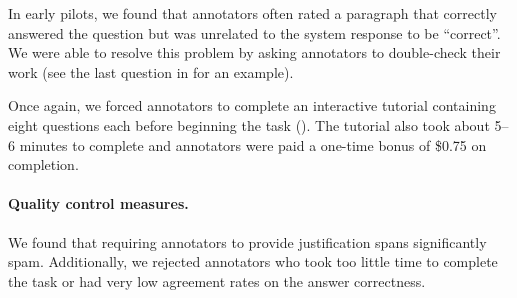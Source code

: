 In early pilots, we found that annotators often rated a paragraph that correctly answered the question but was unrelated to the system response to be ``correct''.
We were able to resolve this problem by asking annotators to double-check their work (see the last question in  for an example).

Once again, we forced annotators to complete an interactive tutorial containing eight questions each before beginning the task ().
The tutorial also took about 5--6 minutes to complete and annotators were paid a one-time bonus of \$0.75 on completion.

\paragraph{Quality control measures.}
We found that requiring annotators to provide justification spans significantly spam.
Additionally, we rejected annotators who took too little time to complete the task or had very low agreement rates on the answer correctness.

%
